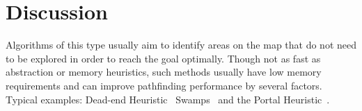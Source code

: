 \section{Discussion}
\label{cha::lit::discussion}
Algorithms of this type usually aim to identify areas on the map that do not need to be explored in
order to reach the goal optimally. Though not as fast as abstraction or memory
heuristics, such methods usually have low memory requirements and can improve
pathfinding performance by several factors. Typical examples: Dead-end Heuristic~\cite{bjornsson06}
Swamps~\cite{pochter09} and the Portal Heuristic~\cite{goldenberg10}.
